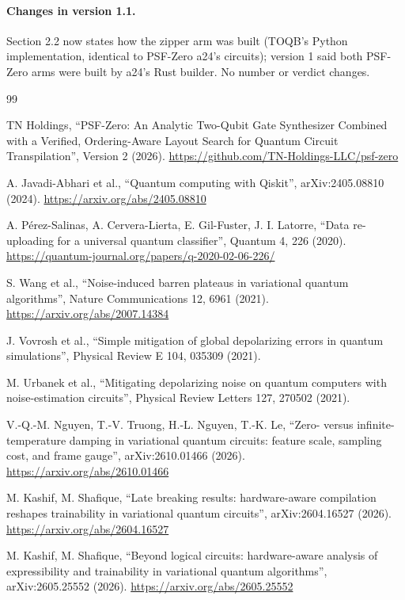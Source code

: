 \documentclass[11pt]{article}
\begin{document}
\paragraph{Changes in version 1.1.} Section 2.2 now states how the zipper arm was built (TOQB's Python
implementation, identical to PSF-Zero a24's circuits); version 1 said both PSF-Zero arms were built by a24's Rust
builder. No number or verdict changes.

\begin{thebibliography}{99}

 TN Holdings, ``PSF-Zero: An Analytic Two-Qubit Gate Synthesizer Combined with a Verified,
Ordering-Aware Layout Search for Quantum Circuit Transpilation'', Version 2 (2026).
\url{https://github.com/TN-Holdings-LLC/psf-zero}

 A. Javadi-Abhari et al., ``Quantum computing with Qiskit'', arXiv:2405.08810 (2024).
\url{https://arxiv.org/abs/2405.08810}

 A. P\'erez-Salinas, A. Cervera-Lierta, E. Gil-Fuster, J. I. Latorre, ``Data re-uploading for a
universal quantum classifier'', Quantum 4, 226 (2020). \url{https://quantum-journal.org/papers/q-2020-02-06-226/}

 S. Wang et al., ``Noise-induced barren plateaus in variational quantum algorithms'', Nature
Communications 12, 6961 (2021). \url{https://arxiv.org/abs/2007.14384}

 J. Vovrosh et al., ``Simple mitigation of global depolarizing errors in quantum simulations'',
Physical Review E 104, 035309 (2021).

 M. Urbanek et al., ``Mitigating depolarizing noise on quantum computers with noise-estimation
circuits'', Physical Review Letters 127, 270502 (2021).

 V.-Q.-M. Nguyen, T.-V. Truong, H.-L. Nguyen, T.-K. Le, ``Zero- versus infinite-temperature
damping in variational quantum circuits: feature scale, sampling cost, and frame gauge'', arXiv:2610.01466 (2026).
\url{https://arxiv.org/abs/2610.01466}

 M. Kashif, M. Shafique, ``Late breaking results: hardware-aware compilation reshapes
trainability in variational quantum circuits'', arXiv:2604.16527 (2026). \url{https://arxiv.org/abs/2604.16527}

 M. Kashif, M. Shafique, ``Beyond logical circuits: hardware-aware analysis of expressibility and
trainability in variational quantum algorithms'', arXiv:2605.25552 (2026). \url{https://arxiv.org/abs/2605.25552}


\end{thebibliography}
\end{document}
